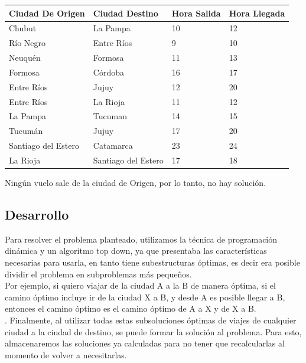 \documentclass[10pt,a4paper]{article}
\begin{document}
\begin{enumerate}
\begin{center}
	\begin{tabular}{| l | l | l | l |}
	\hline
	Ciudad De Origen & Ciudad Destino & Hora Salida & Hora Llegada\\ \hline
	Chubut & La Pampa & 10 &	12\\
	Río Negro & Entre Ríos & 9 & 10 \\
	Neuquén & Formosa	&	11	& 13\\
	Formosa	& Córdoba	& 16 & 17  \\
	Entre Ríos & Jujuy	& 12 & 20\\
	Entre Ríos & La Rioja	&	11 & 12\\
	La Pampa & Tucuman	&	14 & 15\\
	Tucumán & Jujuy &	17 & 20\\
	Santiago del Estero	& Catamarca & 23 & 24\\
	La Rioja & Santiago del Estero & 17&18\\
	\hline
	\end{tabular}
\end{center}

Ningún vuelo sale de la ciudad de Origen, por lo tanto, no hay solución.





\end{enumerate}

\newpage
\subsection{Desarrollo}


Para resolver el problema planteado, utilizamos la técnica de programación dinámica y un algoritmo top down, ya que presentaba las características necesarias para usarla, en tanto tiene subestructuras óptimas, es decir era posible dividir el problema en subproblemas más pequeños.\\

Por ejemplo, si quiero viajar de la ciudad A a la B de manera óptima, si el camino óptimo incluye ir de la ciudad X a B, y desde A es posible llegar a B, entonces el camino óptimo es el camino óptimo de A a X y de X a B.\\
.
Finalmente, al utilizar todas estas subsoluciones óptimas de viajes de cualquier ciudad a la ciudad de destino, se puede formar la solución al problema. Para esto, almacenaremos las soluciones ya calculadas para no tener que recalcularlas al momento de volver a necesitarlas.\\
\end{document}
